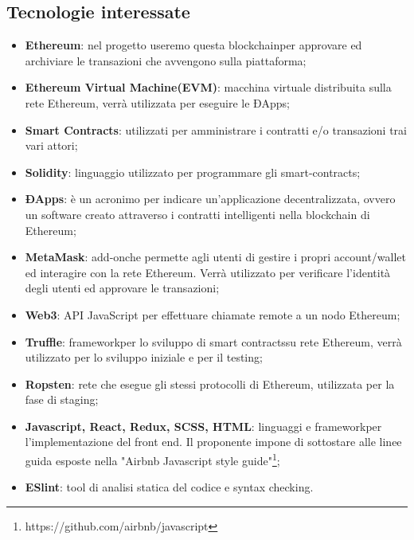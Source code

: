 \subsection{Tecnologie interessate}
\begin{itemize}
  
	\item \textbf{Ethereum\glo}: nel progetto useremo questa blockchain\glosp per approvare ed archiviare le transazioni che avvengono sulla piattaforma;
	\item \textbf{Ethereum Virtual Machine\glosp (EVM)}: macchina virtuale distribuita sulla rete Ethereum\glo, verrà utilizzata per eseguire le ÐApps\glo; 
	\item \textbf{Smart Contracts\glo}: utilizzati per amministrare i contratti e/o transazioni trai vari attori;
	\item \textbf{Solidity}: linguaggio utilizzato per programmare gli smart-contracts\glo;
	\item \textbf{ÐApps\glo}: è un acronimo per indicare un'applicazione decentralizzata, ovvero un software creato attraverso i contratti intelligenti nella blockchain di Ethereum\glo;
	\item \textbf{MetaMask\glo}: add-on\glosp che permette agli utenti di gestire i propri account/wallet ed interagire con la rete Ethereum\glo. Verrà utilizzato per verificare l'identità degli utenti ed approvare le transazioni; 
	\item \textbf{Web3}: API JavaScript per effettuare chiamate remote a un nodo Ethereum\glo;
	\item \textbf{Truffle}: framework\glosp per lo sviluppo di smart contracts\glosp su rete Ethereum\glo, verrà utilizzato per lo sviluppo iniziale e per il testing;
	\item \textbf {Ropsten}: rete che esegue gli stessi protocolli di Ethereum\glo, utilizzata per la fase di staging\glo;
	\item \textbf{Javascript, React\glo, Redux\glo, SCSS\glo, HTML}: linguaggi e framework\glosp per l'implementazione del front end\glo. Il proponente impone di sottostare alle linee guida esposte nella "Airbnb Javascript style guide"\footnote{https://github.com/airbnb/javascript};
	\item \textbf{ESlint\glo}: tool di analisi statica del codice e syntax checking.

\end{itemize}

